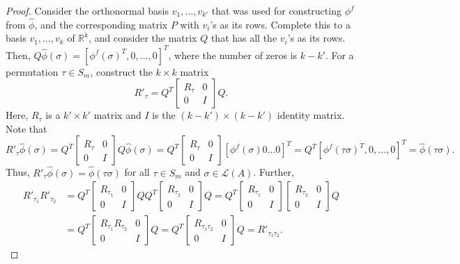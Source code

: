 \documentclass[prodmode]{acmsmall-ec14}
\newcommand{\calL}{{\mathcal{L}}}
\newcommand{\rank}{{\calL(A)}}
\begin{document}
\begin{proof}
Consider the orthonormal basis $v_1,\ldots,v_{k'}$ that was used for constructing $\phi^f$ from $\hat{\phi}$, and the corresponding matrix $P$ with $v_i$'s as its rows. Complete this to a basis $v_1,\ldots,v_k$ of $\mathbb{R}^k$, and consider the matrix $Q$ that has all the $v_i$'s as its rows. Then, $Q \hat{\phi}(\sigma) = [\phi^f(\sigma)^T, 0, \ldots, 0]^T$, where the number of zeros is $k-k'$. For a permutation $\tau \in S_m$, construct the $k \times k$ matrix 
$$
R'_{\tau} = Q^T \left[ \begin{smallmatrix} R_{\tau} & 0 \\ 0 & I \end{smallmatrix} \right] Q. 
$$
Here, $R_{\tau}$ is a $k' \times k'$ matrix and $I$ is the $(k-k') \times (k-k')$ identity matrix. Note that 
$$
R'_{\tau} \hat{\phi}(\sigma) = Q^T \left[ \begin{smallmatrix} R_{\tau} & 0 \\ 0 & I \end{smallmatrix} \right] Q \hat{\phi}(\sigma) = Q^T \left[ \begin{smallmatrix} R_{\tau} & 0 \\ 0 & I \end{smallmatrix} \right] [\phi^f(\sigma) 0 \ldots 0]^T = Q^T [\phi^f(\tau \sigma)^T, 0, \ldots, 0]^T = \hat{\phi}(\tau \sigma).
$$
Thus, $R'_{\tau} \hat{\phi}(\sigma) = \hat{\phi}(\tau \sigma)$ for all $\tau \in S_m$ and $\sigma \in \rank$. Further, 
\begin{align*}
R'_{\tau_1} R'_{\tau_2} &= Q^T \left[ \begin{smallmatrix} R_{\tau_1} & 0 \\ 0 & I \end{smallmatrix} \right] Q Q^T \left[ \begin{smallmatrix} R_{\tau_2} & 0 \\ 0 & I \end{smallmatrix} \right] Q = Q^T \left[ \begin{smallmatrix} R_{\tau_1} & 0 \\ 0 & I \end{smallmatrix} \right] \left[ \begin{smallmatrix} R_{\tau_2} & 0 \\ 0 & I \end{smallmatrix} \right] Q \\
&= Q^T \left[ \begin{smallmatrix} R_{\tau_1} R_{\tau_2} & 0 \\ 0 & I \end{smallmatrix} \right] Q = Q^T \left[ \begin{smallmatrix} R_{\tau_1 \tau_2} & 0 \\ 0 & I \end{smallmatrix} \right] Q = R'_{\tau_1 \tau_2}.

\end{align*}
\end{proof}
\end{document}
